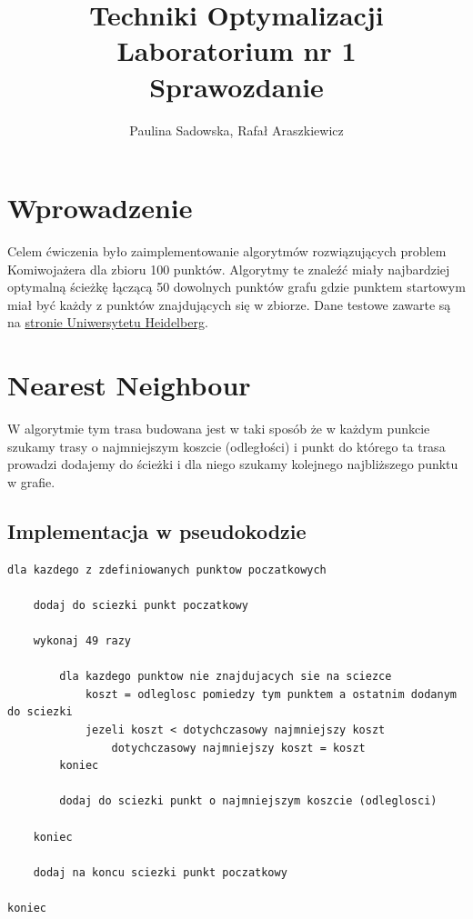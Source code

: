 \documentclass[a4paper 10pt]{article}
\title{\textbf{Techniki Optymalizacji} \\
Laboratorium nr 1 \\
Sprawozdanie}
\author{Paulina Sadowska, Rafał Araszkiewicz}
\begin{document}
\maketitle

\section{Wprowadzenie}
Celem ćwiczenia było zaimplementowanie algorytmów rozwiązujących problem Komiwojażera dla zbioru 100 punktów. Algorytmy te znaleźć miały najbardziej optymalną ścieżkę łączącą 50 dowolnych punktów grafu gdzie punktem startowym miał być każdy z punktów znajdujących się w zbiorze. Dane testowe zawarte są na \hyperref[http://comopt.ifi.uni-heidelberg.de/software/TSPLIB95/XML-TSPLIB/instances/kroA100.xml.zip]{stronie Uniwersytetu Heidelberg}. 
\section{Nearest Neighbour}
\label{Nearest}
W algorytmie tym trasa budowana jest w taki sposób że w każdym punkcie szukamy trasy o najmniejszym koszcie (odległości) i punkt do którego ta trasa prowadzi dodajemy do ścieżki i dla niego szukamy kolejnego najbliższego punktu w grafie.
\subsection{Implementacja w pseudokodzie}
\begin{lstlisting}[frame=single]
dla kazdego z zdefiniowanych punktow poczatkowych
	
	dodaj do sciezki punkt poczatkowy
			
	wykonaj 49 razy 
	
		dla kazdego punktow nie znajdujacych sie na sciezce
			koszt = odleglosc pomiedzy tym punktem a ostatnim dodanym do sciezki
			jezeli koszt < dotychczasowy najmniejszy koszt
				dotychczasowy najmniejszy koszt = koszt
		koniec
	
		dodaj do sciezki punkt o najmniejszym koszcie (odleglosci)
		
	koniec	
	
	dodaj na koncu sciezki punkt poczatkowy
	
koniec

\end{lstlisting}
\label{Nearest code}
\end{document}
